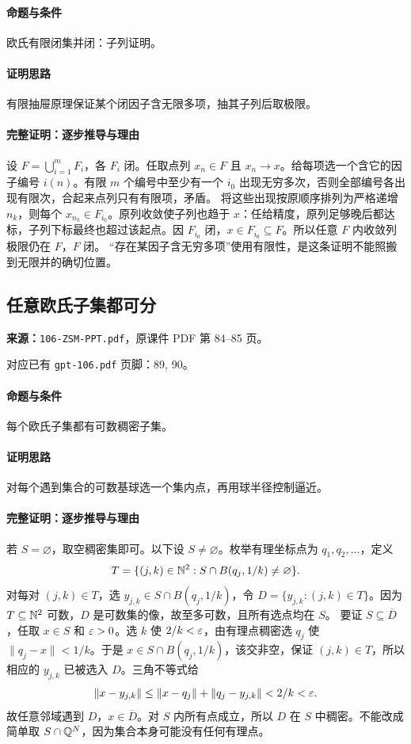 \paragraph{命题与条件}欧氏有限闭集并闭：子列证明。
\paragraph{证明思路}有限抽屉原理保证某个闭因子含无限多项，抽其子列后取极限。
\paragraph{完整证明：逐步推导与理由}

设 $F=\bigcup_{i=1}^m F_i$，各 $F_i$ 闭。任取点列 $x_n\in F$ 且 $x_n\to x$。给每项选一个含它的因子编号 $i(n)$。有限 $m$ 个编号中至少有一个 $i_0$ 出现无穷多次，否则全部编号各出现有限次，合起来点列只有有限项，矛盾。
将这些出现按原顺序排列为严格递增 $n_k$，则每个 $x_{n_k}\in F_{i_0}$。原列收敛使子列也趋于 $x$：任给精度，原列足够晚后都达标，子列下标最终也超过该起点。因 $F_{i_0}$ 闭，$x\in F_{i_0}\subseteq F$。所以任意 $F$ 内收敛列极限仍在 $F$，$F$ 闭。
“存在某因子含无穷多项”使用有限性，是这条证明不能照搬到无限并的确切位置。

\clearpage\subsection{任意欧氏子集都可分}
\textbf{来源：}\texttt{106-ZSM-PPT.pdf}，原课件 PDF 第 84--85 页。\par
对应已有 \texttt{gpt-106.pdf} 页脚：89, 90。\par
\paragraph{命题与条件}每个欧氏子集都有可数稠密子集。
\paragraph{证明思路}对每个遇到集合的可数基球选一个集内点，再用球半径控制逼近。
\paragraph{完整证明：逐步推导与理由}

若 $S=\varnothing$，取空稠密集即可。以下设 $S\ne\varnothing$。枚举有理坐标点为 $q_1,q_2,\ldots$，定义
\[T=\{(j,k)\in\mathbb{N}^2:S\cap B(q_j,1/k)\ne\varnothing\}.\]
对每对 $(j,k)\in T$，选 $y_{j,k}\in S\cap B(q_j,1/k)$，令 $D=\{y_{j,k}:(j,k)\in T\}$。因为 $T\subseteq\mathbb{N}^2$ 可数，$D$ 是可数集的像，故至多可数，且所有选点均在 $S$。
要证 $S\subseteq\overline D$，任取 $x\in S$ 和 $\varepsilon>0$。选 $k$ 使 $2/k<\varepsilon$，由有理点稠密选 $q_j$ 使 $\|q_j-x\|<1/k$。于是 $x\in S\cap B(q_j,1/k)$，该交非空，保证 $(j,k)\in T$，所以相应的 $y_{j,k}$ 已被选入 $D$。三角不等式给
\[\|x-y_{j,k}\|\le\|x-q_j\|+\|q_j-y_{j,k}\|<2/k<\varepsilon.\]
故任意邻域遇到 $D$，$x\in\overline D$。对 $S$ 内所有点成立，所以 $D$ 在 $S$ 中稠密。不能改成简单取 $S\cap\mathbb{Q}^N$，因为集合本身可能没有任何有理点。


